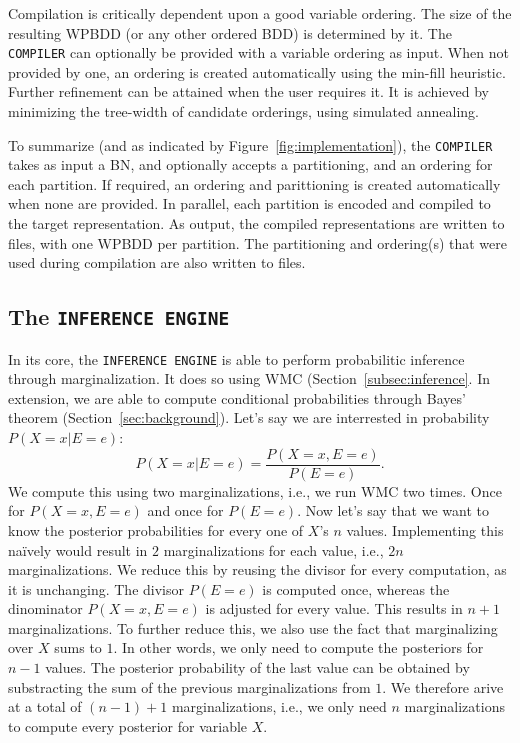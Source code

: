 Compilation is critically dependent upon a good variable ordering. The size of the resulting WPBDD (or any other ordered BDD) is determined by it. The \texttt{COMPILER} can optionally be provided with a variable ordering as input. When not provided by one, an ordering is created automatically using the min-fill heuristic. Further refinement can be attained when the user requires it. It is achieved by minimizing the tree-width of candidate orderings, using simulated annealing.

To summarize (and as indicated by Figure~\ref{fig:implementation}), the \texttt{COMPILER} takes as input a BN, and optionally accepts a partitioning, and an ordering for each partition. If required, an ordering and parittioning is created automatically when none are provided. In parallel, each partition is encoded and compiled to the target representation. As output, the compiled representations are written to files, with one WPBDD per partition. The partitioning and ordering(s) that were used during compilation are also written to files.

\subsection{The \texttt{INFERENCE ENGINE}}

In its core, the \texttt{INFERENCE ENGINE} is able to perform probabilitic inference through marginalization. It does so using WMC (Section~\ref{subsec:inference}. In extension, we are able to compute conditional probabilities through Bayes' theorem (Section~\ref{sec:background}). Let's say we are interrested in probability $P(X = x | E = e)$:  \[P(X = x | E = e) = \frac{P(X = x, E = e)}{P(E = e)}.\]
We compute this using two marginalizations, i.e., we run WMC two times. Once for $P(X = x, E = e)$ and once for $P(E = e)$. Now let's say that we want to know the posterior probabilities for every one of $X$'s $n$ values. Implementing this na\"ively would result in $2$ marginalizations for each value, i.e., $2n$ marginalizations. We reduce this by reusing the divisor for every computation, as it is unchanging. The divisor $P(E = e)$ is computed once, whereas the dinominator $P(X = x, E = e)$ is adjusted for every value. This results in $n + 1$ marginalizations. To further reduce this, we also use the fact that marginalizing over $X$ sums to $1$. In other words, we only need to compute the posteriors for $n-1$ values. The posterior probability of the last value can be obtained by substracting the sum of the previous marginalizations from $1$. We therefore arive at a total of $(n-1) + 1$ marginalizations, i.e., we only need $n$ marginalizations to compute every posterior for variable $X$.

